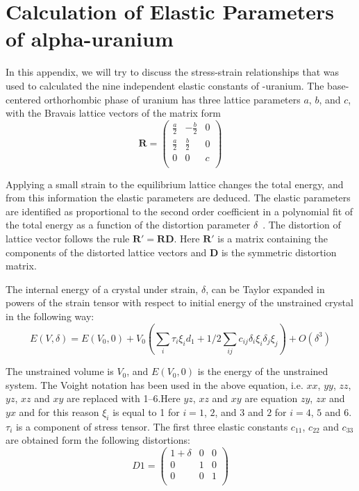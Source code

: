 \chapter{Calculation of Elastic Parameters of alpha-uranium}\label{appen_elalpha}

In this appendix, we will try to discuss the stress-strain relationships that was used to calculated the nine independent elastic constants of \textalpha-uranium. The base-centered orthorhombic phase of uranium has three lattice parameters $a$, $b$, and $c$, with the Bravais lattice vectors of the matrix form
	\begin{equation}
	\label{eq_lattice_alphaU}
	\mathbf{R} = \left ( \begin{array}{ccc}
	\frac{a}{2} & -\frac{b}{2} & 0 \\
	\frac{a}{2} & \frac{b}{2} & 0 \\
	0 & 0 & c \\
	\end{array}\right ) 
\end{equation}

Applying a small strain to the equilibrium lattice changes the total energy, and from this information the elastic parameters are deduced. The elastic parameters are identified as proportional to the second order coefficient in a polynomial fit of the total energy as a function of the distortion parameter $\delta$~\cite{wallace1998thermodynamics}. The distortion of lattice vector follows the rule $\mathbf{R'}=\mathbf{RD}$. Here $\mathbf{R'}$ is a matrix containing the components of the distorted lattice vectors and $\mathbf{D}$ is the symmetric distortion matrix.



The internal energy of a crystal under strain, $\delta$, can be Taylor expanded in powers of the strain tensor with respect to initial energy of the unstrained crystal in the following way:
	\begin{equation}
	\label{eq_taylor_el}
	E(V,\delta) = E(V_0,0) + V_0 \left ( \sum_i \tau_i \xi_i d_1 + 1/2 \sum_{ij} c_{ij} \delta_i \xi_i \delta_j \xi_j \right ) + O(\delta^3) 
	\end{equation}

The unstrained volume is $V_0$, and $E(V_0,0)$ is the energy of the unstrained system. The Voight notation has been used in the above equation, i.e. $xx$, $yy$, $zz$, $yz$, $xz$ and $xy$ are replaced with 1--6.Here $yz$, $xz$ and $xy$ are equation $zy$, $zx$ and $yx$ and for this reason $\xi_i$ is equal to 1 for $i=1$, $2$, and $3$ and $2$ for $i=4$, $5$ and $6$. $\tau_i$ is a component of stress tensor. The first three elastic constants $c_{11}$, $c_{22}$ and $c_{33}$ are obtained form the following distortions:
\begin{equation}
\label{eq_D1}
	D1 = \left ( \begin{array}{ccc}
						1+\delta & 0 & 0 \\
						0 & 1 & 0 \\
						0 & 0 & 1 \\
						\end{array}\right )
\end{equation}

